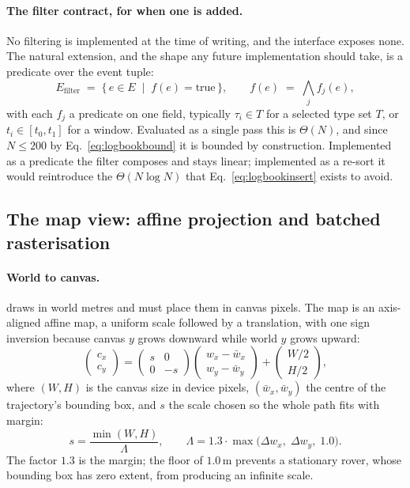 \paragraph{The filter contract, for when one is added.}
No filtering is implemented at the time of writing, and the interface exposes
none. The natural extension, and the shape any future implementation should
take, is a predicate over the event tuple:
\begin{equation}
E_{\text{filter}} \;=\; \{\, e \in E \;\mid\; f(e) = \text{true} \,\},
\qquad
f(e) \;=\; \bigwedge_{j} f_j(e),
\label{eq:logbookfilter}
\end{equation}
with each $f_j$ a predicate on one field, typically $\tau_i \in T$ for a
selected type set $T$, or $t_i \in [t_0, t_1]$ for a window. Evaluated as a
single pass this is $\Theta(N)$, and since $N \le 200$ by
Eq.~\ref{eq:logbookbound} it is bounded by construction. Implemented as a
predicate the filter composes and stays linear; implemented as a re-sort it
would reintroduce the $\Theta(N \log N)$ that Eq.~\ref{eq:logbookinsert}
exists to avoid.

\subsection{The map view: affine projection and batched rasterisation}

\paragraph{World to canvas.}  draws in world metres and
must place them in canvas pixels. The map is an axis-aligned affine map, a
uniform scale followed by a translation, with one sign inversion because
canvas $y$ grows downward while world $y$ grows upward:
\begin{equation}
\begin{pmatrix} c_x \\ c_y \end{pmatrix}
=
\begin{pmatrix} s & 0 \\ 0 & -s \end{pmatrix}
\begin{pmatrix} w_x - \bar{w}_x \\ w_y - \bar{w}_y \end{pmatrix}
+
\begin{pmatrix} W/2 \\ H/2 \end{pmatrix},
\label{eq:worldtocanvas}
\end{equation}
where $(W,H)$ is the canvas size in device pixels, $(\bar{w}_x, \bar{w}_y)$
the centre of the trajectory's bounding box, and $s$ the scale chosen so the
whole path fits with margin:
\begin{equation}
s = \frac{\min(W,H)}{\Lambda},
\qquad
\Lambda = 1.3 \cdot \max\bigl(\Delta w_x,\; \Delta w_y,\; 1.0\bigr).
\label{eq:mapscale}
\end{equation}
The factor $1.3$ is the margin; the floor of $1.0$\,m prevents a stationary
rover, whose bounding box has zero extent, from producing an infinite scale.

